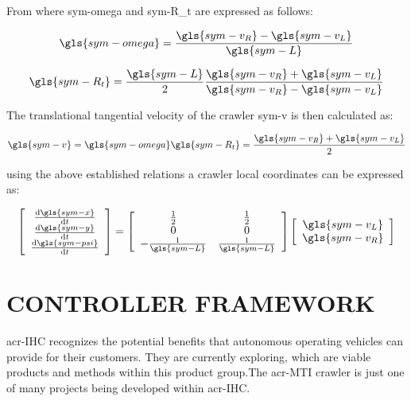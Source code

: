 \noindent From where \gls{sym-omega} and \gls{sym-R_t} are expressed as follows:

\begin{equation}\label{eq:omega_t}
	\gls{sym-omega} = \frac{\gls{sym-v_R} - \gls{sym-v_L}}{\gls{sym-L}}
\end{equation}

\begin{equation}\label{eq:R_t}
	\gls{sym-R_t} = \frac{\gls{sym-L}}{2}\frac{\gls{sym-v_R} + \gls{sym-v_L}}{\gls{sym-v_R} - \gls{sym-v_L}}
\end{equation}

\noindent The translational tangential velocity of the crawler \gls{sym-v} is then calculated as:

\begin{equation}\label{eq:v_crawler}
	\gls{sym-v} = \gls{sym-omega} \gls{sym-R_t} = \frac{\gls{sym-v_R} + \gls{sym-v_L}}{2}
\end{equation}

\noindent using the above established relations a crawler local coordinates can be expressed as:

\begin{equation}\label{eq:local_frame}
	\left[\begin{array}{c}
		\dv{\gls{sym-x}}{t} \\
		\dv{\gls{sym-y}}{t} \\
		\dv{\gls{sym-psi}}{t}
	\end{array}\right] = \left[\begin{array}{cc}
		\frac{1}{2} & \frac{1}{2} \\
		0 & 0 \\
		-\frac{1}{\gls{sym-L}} & \frac{1}{\gls{sym-L}}
	\end{array}\right] \left[\begin{array}{c}
	  \gls{sym-v_L} \\
		\gls{sym-v_R}
	\end{array}\right]
\end{equation}

\section{CONTROLLER FRAMEWORK}\label{sec:controller}

\gls{acr-IHC} recognizes the potential benefits that autonomous operating vehicles can provide for their customers. They
are currently exploring, which are viable products and methods within this product group.The \gls{acr-MTI} crawler is
just one of many projects being developed within \gls{acr-IHC}.

